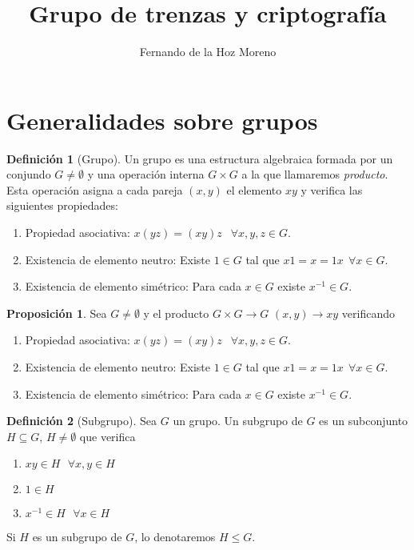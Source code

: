 \documentclass[12pt]{article}
\title{Grupo de trenzas y criptografía}
\author{Fernando de la Hoz Moreno}
\date{}
\theoremstyle{definition}
\newtheorem{defi}{Definición}[section]
\newtheorem{prop}{Proposición}[section]
\begin{document}
\maketitle

\section{Generalidades sobre grupos}

\begin{defi}[Grupo]
Un grupo es una estructura algebraica formada por un conjundo $G\neq\emptyset$ y una operación interna $G\times G$ a la que llamaremos \textit{producto}. Esta operación asigna a cada pareja $(x,y)$ el elemento $xy$ y verifica las siguientes propiedades:

\begin{enumerate}
\item Propiedad asociativa: $x(yz) = (xy)z$ $\ \ \forall x,y,z\in G$.
\item Existencia de elemento neutro: Existe $1\in G$ tal que $x1= x = 1x\ \ \forall x\in G$.
\item Existencia de elemento simétrico: Para cada $x \in G$ existe $x^{-1}\in G$.
\end{enumerate}
\end{defi}

\begin{prop}
Sea $G\neq\emptyset$ y el producto $G\times G\rightarrow G$ $(x,y)\rightarrow xy$ verificando

\begin{enumerate}
\item Propiedad asociativa: $x(yz) = (xy)z$ $\ \ \forall x,y,z\in G$.
\item Existencia de elemento neutro: Existe $1\in G$ tal que $x1= x = 1x\ \ \forall x\in G$.
\item Existencia de elemento simétrico: Para cada $x \in G$ existe $x^{-1}\in G$.
\end{enumerate}

\end{prop}

\begin{defi}[Subgrupo]
Sea $G$ un grupo. Un subgrupo de $G$ es un subconjunto $H\subseteq G$, $H\neq\emptyset$ que verifica
\begin{enumerate}
\item $xy\in H\ \ \ \forall x,y\in H$ 
\item $1\in H$
\item $x^{-1}\in H\ \ \ \forall x\in H$
\end{enumerate}

Si $H$ es un subgrupo de $G$, lo denotaremos $H\leq G$.



\end{defi}
\end{document}
